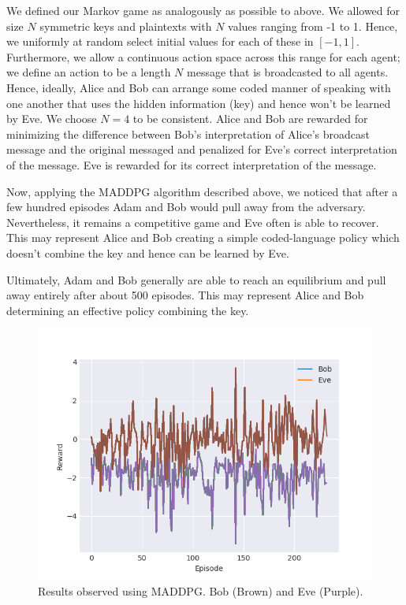 \documentclass{llncs}
\begin{document}
We defined our Markov game as analogously as possible to above. We allowed for size $N$ symmetric keys and plaintexts with $N$ values ranging from -1 to 1. Hence, we uniformly at random select initial values for each of these in $[-1, 1]$. Furthermore, we allow a continuous action space across this range for each agent; we define an action to be a length $N$ message that is broadcasted to all agents. Hence, ideally, Alice and Bob can arrange some coded manner of speaking with one another that uses the hidden information (key) and hence won't be learned by Eve. We choose $N=4$ to be consistent. Alice and Bob are rewarded for minimizing the difference between Bob's interpretation of Alice's broadcast message and the original messaged and penalized for Eve's correct interpretation of the message. Eve is rewarded for its correct interpretation of the message.

Now, applying the MADDPG algorithm described above, we noticed that after a few hundred episodes Adam and Bob would pull away from the adversary. Nevertheless, it remains a competitive game and Eve often is able to recover. This may represent Alice and Bob creating a simple coded-language policy which doesn't combine the key and hence can be learned by Eve. 

Ultimately, Adam and Bob generally are able to reach an equilibrium and pull away entirely after about 500 episodes. This may represent Alice and Bob determining an effective policy combining the key. 

\begin{figure}
  \centering
    \includegraphics[width=\textwidth]{RL_anc.png}
    \caption{Results observed using MADDPG. Bob (Brown) and Eve (Purple).}
\end{figure}
\end{document}
